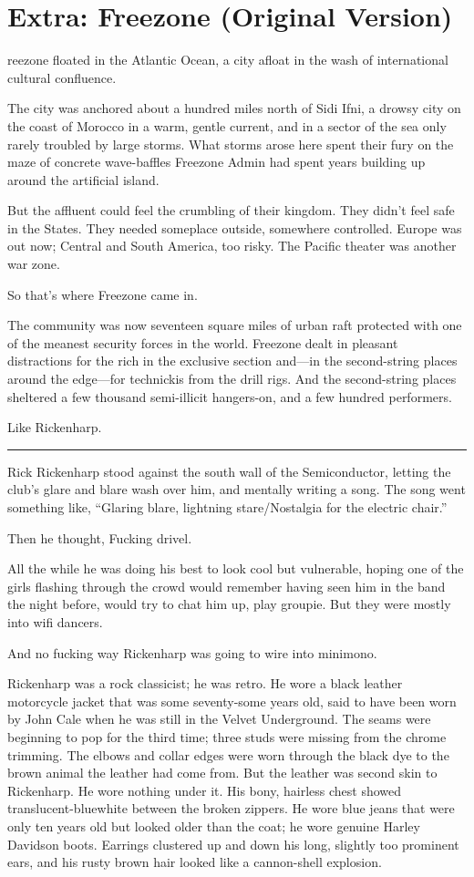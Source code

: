 \chapter{Extra: Freezone (Original Version)}

reezone floated in the Atlantic Ocean, a city afloat in the wash of international cultural confluence.

The city was anchored about a hundred miles north of Sidi Ifni, a drowsy city on the coast of Morocco in a warm, gentle current, and in a sector of the sea only rarely troubled by large storms. What storms arose here spent their fury on the maze of concrete wave-baffles Freezone Admin had spent years building up around the artificial island.

But the affluent could feel the crumbling of their kingdom. They didn't feel safe in the States. They needed someplace outside, somewhere controlled. Europe was out now; Central and South America, too risky. The Pacific theater was another war zone.

So that's where Freezone came in.

The community was now seventeen square miles of urban raft protected with one of the meanest security forces in the world. Freezone dealt in pleasant distractions for the rich in the exclusive section and—in the second-string places around the edge—for technickis from the drill rigs. And the second-string places sheltered a few thousand semi-illicit hangers-on, and a few hundred performers.

Like Rickenharp.

\fancybreak{* * *}

Rick Rickenharp stood against the south wall of the Semiconductor, letting the club's glare and blare wash over him, and mentally writing a song. The song went something like, ``Glaring blare, lightning stare/Nostalgia for the electric chair.''

Then he thought, Fucking drivel.

All the while he was doing his best to look cool but vulnerable, hoping one of the girls flashing through the crowd would remember having seen him in the band the night before, would try to chat him up, play groupie. But they were mostly into wifi dancers.

And no fucking way Rickenharp was going to wire into minimono.

Rickenharp was a rock classicist; he was retro. He wore a black leather motorcycle jacket that was some seventy-some years old, said to have been worn by John Cale when he was still in the Velvet Underground. The seams were beginning to pop for the third time; three studs were missing from the chrome trimming. The elbows and collar edges were worn through the black dye to the brown animal the leather had come from. But the leather was second skin to Rickenharp. He wore nothing under it. His bony, hairless chest showed translucent-bluewhite between the broken zippers. He wore blue jeans that were only ten years old but looked older than the coat; he wore genuine Harley Davidson boots. Earrings clustered up and down his long, slightly too prominent ears, and his rusty brown hair looked like a cannon-shell explosion.

